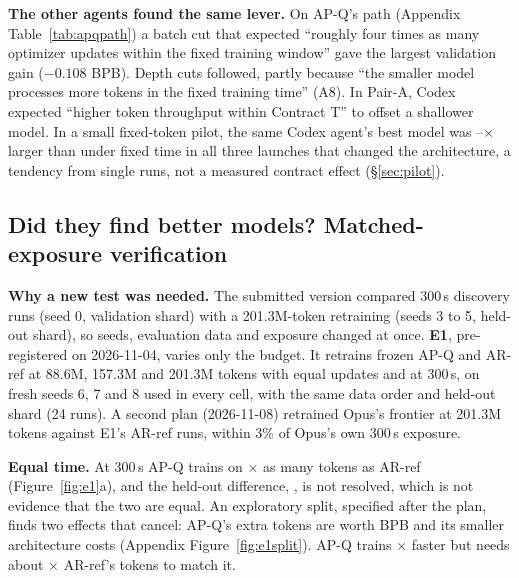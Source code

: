\documentclass{article}
\begin{document}
\textbf{The other agents found the same lever.} On AP-Q's path (Appendix Table~\ref{tab:apqpath}) a batch cut that expected ``roughly four times as many optimizer updates within the fixed training window'' gave the largest validation gain ($-0.108$ BPB). Depth cuts followed, partly because ``the smaller model processes more tokens in the fixed training time'' (A8). In Pair-A, Codex expected ``higher token throughput within Contract T'' to offset a shallower model. In a small fixed-token pilot, the same Codex agent's best model was \CRFivePilotRatioLo--\CRFivePilotRatioHi$\times$ larger than under fixed time in all three launches that changed the architecture, a tendency from single runs, not a measured contract effect (\S\ref{sec:pilot}).

\subsection{Did they find better models? Matched-exposure verification}\label{sec:verify}
\textbf{Why a new test was needed.} The submitted version compared 300\,s discovery runs (seed 0, validation shard) with a 201.3M-token retraining (seeds 3 to 5, held-out shard), so seeds, evaluation data and exposure changed at once. \textbf{E1}, pre-registered on 2026-11-04, varies only the budget. It retrains frozen AP-Q and AR-ref at 88.6M, 157.3M and 201.3M tokens with equal updates and at 300\,s, on fresh seeds 6, 7 and 8 used in every cell, with the same data order and held-out shard (24 runs). A second plan (2026-11-08) retrained Opus's frontier at 201.3M tokens against E1's AR-ref runs, within 3\% of Opus's own 300\,s exposure.

\begin{table}[b]
\begin{minipage}[c]{.61\linewidth}\centering\scriptsize\setlength{\tabcolsep}{4pt}\end{minipage}\hfill
\begin{minipage}[c]{.37\linewidth}\label{tab:results}\end{minipage}
\end{table}

\textbf{Equal time.} At 300\,s AP-Q trains on \CREOneTokRatio$\times$ as many tokens as AR-ref (Figure~\ref{fig:e1}a), and the held-out difference, \CREOneTimeHeldThree{} \CREOneTimeHeldCI, is not resolved, which is not evidence that the two are equal. An exploratory split, specified after the plan, finds two effects that cancel: AP-Q's extra tokens are worth \CREOneExposure{} BPB and its smaller architecture costs \CREOneArch{} (Appendix Figure~\ref{fig:e1split}). AP-Q trains \CREOneRho$\times$ faster but needs about \CREOneK$\times$ AR-ref's tokens to match it.
\end{document}

